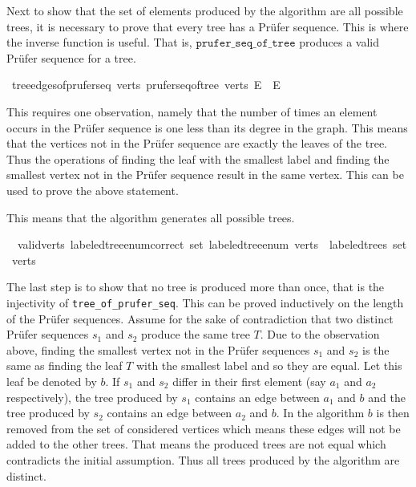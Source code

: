 Next to show that the set of elements produced by the algorithm are all possible trees, it is necessary to prove that every tree has a Prüfer sequence.
This is where the inverse function is useful.
That is, $\texttt{prufer\_seq\_of\_tree}$ produces a valid Prüfer sequence for a tree.

\begin{isabellebox}
    \isamarkupfalse%
    \ {\isachardoublequoteopen}tree{\isacharunderscore}{\kern0pt}edges{\isacharunderscore}{\kern0pt}of{\isacharunderscore}{\kern0pt}prufer{\isacharunderscore}{\kern0pt}seq\ verts\ {\isacharparenleft}{\kern0pt}prufer{\isacharunderscore}{\kern0pt}seq{\isacharunderscore}{\kern0pt}of{\isacharunderscore}{\kern0pt}tree\ verts\ E{\isacharparenright}{\kern0pt}\ {\isacharequal}{\kern0pt}\ E{\isachardoublequoteclose}
\end{isabellebox}

This requires one observation, namely that the number of times an element occurs in the Prüfer sequence is one less than its degree in the graph.
This means that the vertices not in the Prüfer sequence are exactly the leaves of the tree.
Thus the operations of finding the leaf with the smallest label and finding the smallest vertex not in the Prüfer sequence result in the same vertex.
This can be used to prove the above statement.

This means that the algorithm generates all possible trees.

\begin{isabellebox}
    \isamarkupfalse%
    \ {\isacharparenleft}{\kern0pt}\ valid{\isacharunderscore}{\kern0pt}verts{\isacharparenright}{\kern0pt}\ labeled{\isacharunderscore}{\kern0pt}tree{\isacharunderscore}{\kern0pt}enum{\isacharunderscore}{\kern0pt}correct{\isacharcolon}{\kern0pt}\ {\isachardoublequoteopen}set\ {\isacharparenleft}{\kern0pt}labeled{\isacharunderscore}{\kern0pt}tree{\isacharunderscore}{\kern0pt}enum\ verts{\isacharparenright}{\kern0pt}\ {\isacharequal}{\kern0pt}\ labeled{\isacharunderscore}{\kern0pt}trees\ {\isacharparenleft}{\kern0pt}set\ verts{\isacharparenright}{\kern0pt}{\isachardoublequoteclose}
\end{isabellebox}

The last step is to show that no tree is produced more than once, that is the injectivity of \texttt{tree\_of\_prufer\_seq}.
This can be proved inductively on the length of the Prüfer sequences.
Assume for the sake of contradiction that two distinct Prüfer sequences $s_1$ and $s_2$ produce the same tree $T$.
Due to the observation above, finding the smallest vertex not in the Prüfer sequences $s_1$ and $s_2$ is the same as finding the leaf $T$ with the smallest label and so they are equal.
Let this leaf be denoted by $b$.
If $s_1$ and $s_2$ differ in their first element (say $a_1$ and $a_2$ respectively), the tree produced by $s_1$ contains an edge between $a_1$ and $b$ and the tree produced by $s_2$ contains an edge between $a_2$ and $b$.
In the algorithm $b$ is then removed from the set of considered vertices which means these edges will not be added to the other trees.
That means the produced trees are not equal which contradicts the initial assumption.
Thus all trees produced by the algorithm are distinct.

